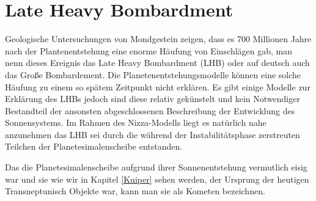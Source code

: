 \documentclass[10pt,a4paper,twoside]{article}
\begin{document}
\section{Late Heavy Bombardment}\label{LHB}
Geologische Untersuchungen von Mondgestein zeigen, dass es 700 Millionen Jahre nach der Plantenentstehung
eine enorme Häufung von Einschlägen gab, man nenn dieses Ereignis das Late Heavy Bombardment (LHB) oder auf deutsch auch das Große Bombardement.
Die Planetenentstehungsmodelle können eine solche Häufung zu einem so spätem Zeitpunkt nicht erklären.
Es gibt einige Modelle zur Erklärung des LHBs jedoch sind diese relativ gekünstelt und kein Notwendiger Bestandteil der ansonsten abgeschlossenen Beschreibung der Entwicklung des Sonnensystems.\cite{Gomes2005} %
Im Rahmen des Nizza-Modells liegt es natürlich nahe anzunehmen das LHB sei durch die während der Instabilitätsphase zerstreuten Teilchen der Planetesimalenscheibe entstanden. %

Das die Planetesimalenscheibe aufgrund ihrer Sonnenentstehung vermutlich eisig war und sie wie wir in Kapitel \ref{Kuiper} sehen werden, der Ursprung der heutigen Transneptunisch Objekte war, kann man sie als Kometen bezeichnen\cite{Gomes2005}. %
\end{document}
